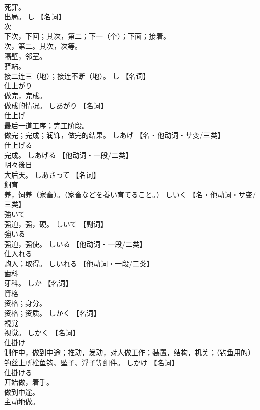 \documentclass[8pt]{extreport}
\begin{document}
\begin{CJK}{UTF8}{min}
\\	死罪。 
\\	出局。	し		【名词】
\\	次	
\\	下次，下回；其次，第二；下一（个）；下面；接着。 
\\	次，第二。其次，次等。 
\\	隔壁，邻室。 
\\	驿站。 
\\	接二连三（地）；接连不断（地）。	し		【名词】
\\	仕上がり	
\\	做完，完成。 
\\	做成的情况。	しあがり		【名词】
\\	仕上げ	
\\	最后一道工序；完工阶段。 
\\	做完；完成；润饰，做完的结果。	しあげ		【名・他动词・サ变/三类】
\\	仕上げる	
\\	完成。	しあげる		【他动词・一段/二类】
\\	明々後日	
\\	大后天。	しあさって		【名词】
\\	飼育	
\\	养，饲养（家畜）。（家畜などを養い育てること。）	しいく		【名・他动词・サ变/三类】
\\	強いて	
\\	强迫，强，硬。	しいて		【副词】
\\	強いる	
\\	强迫，强使。	しいる		【他动词・一段/二类】
\\	仕入れる	
\\	购入；取得。	しいれる		【他动词・一段/二类】
\\	歯科	
\\	牙科。	しか		【名词】
\\	資格	
\\	资格；身分。 
\\	资格；资质。	しかく		【名词】
\\	視覚	
\\	视觉。	しかく		【名词】
\\	仕掛け	
\\	制作中，做到中途；推动，发动，对人做工作；装置，结构，机关；（钓鱼用的）钓丝上所栓鱼钩、坠子、浮子等组件。	しかけ		【名词】
\\	仕掛ける	
\\	开始做，着手。 
\\	做到中途。 
\\	主动地做。 

\end{CJK}
\end{document}
